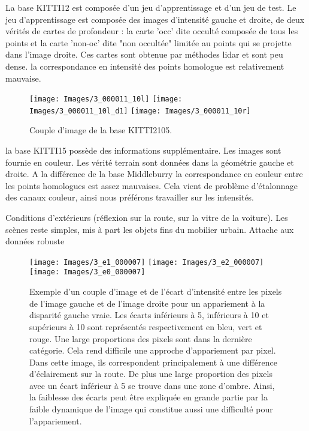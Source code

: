 \documentclass[../main/These_Mathias_Paget.tex]{subfiles}
\begin{document}
La base KITTI12 est composée d'un jeu d'apprentissage et d'un jeu de test. Le jeu d'apprentissage est composée des images d'intensité gauche et droite, de deux vérités de cartes de profondeur : la carte 'occ' dite occulté composée de tous les points et la carte 'non-oc' dite "non occultée" limitée au points qui se projette dans l'image droite. Ces cartes sont obtenue par méthodes lidar et sont peu dense. la correspondance en intensité des points homologue est relativement mauvaise.

\begin{figure}
\centering
\texttt{[image: Images/3\_000011\_10l]}
\texttt{[image: Images/3\_000011\_10l\_d1]}
\hspace{10 px}
\texttt{[image: Images/3\_000011\_10r]}
\caption{Couple d'image de la base KITTI2105.}
\end{figure}

la base KITTI15 possède des informations supplémentaire. Les images sont fournie en couleur. Les vérité terrain sont données dans la géométrie gauche et droite. A la différence de la base Middleburry la correspondance en couleur entre les points homologues est assez mauvaises. Cela vient de problème d’étalonnage des canaux couleur, ainsi nous préférons travailler sur les intensités.

Conditions d'extérieurs (réflexion sur la route, sur la vitre de la voiture). Les scènes reste simples, mis à part les objets fins du mobilier urbain. Attache aux données robuste

\begin{figure}
\centering
\texttt{[image: Images/3\_e1\_000007]}
\texttt{[image: Images/3\_e2\_000007]}
\texttt{[image: Images/3\_e0\_000007]}
\caption{Exemple d'un couple d'image et de l'écart d'intensité entre les pixels de l'image gauche et de l'image droite pour un appariement à la disparité gauche vraie. Les écarts inférieurs à 5, inférieurs à 10 et supérieurs à 10 sont représentés respectivement en bleu, vert et rouge. Une large proportions des pixels sont dans la dernière catégorie. Cela rend difficile une approche d'appariement par pixel. Dans cette image, ils correspondent principalement à une différence d'éclairement sur la route. De plus une large proportion des pixels avec un écart inférieur à 5 se trouve dans une zone d'ombre. Ainsi, la faiblesse des écarts peut être expliquée en grande partie par la faible dynamique de l'image qui constitue aussi une difficulté pour l'appariement.}
\end{figure}
\end{document}
